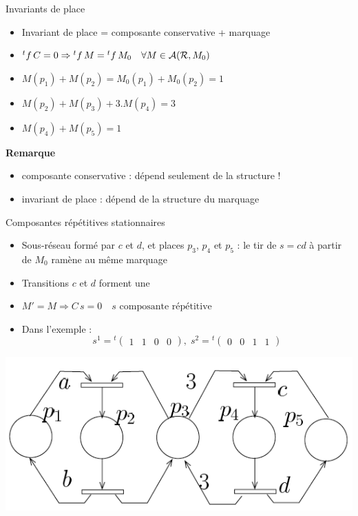 \documentclass[compress]{beamer}
\begin{document}
\begin{frame}{Invariants de place}
\begin{itemize}
\item Invariant de place = composante conservative + marquage
\item ${}^tf \, C = 0 \Rightarrow {}^tf \, M = {}^tf \, M_0 \quad \forall M \in {\cal A(R}, M_0)$
\item $M(p_1) + M(p_2) = M_0(p_1) + M_0(p_2)=1$
\item $M(p_2) + M(p_3) + 3.M(p_4) = 3$  
\item $M(p_4) + M(p_5) =1$  
\end{itemize}
{\bf Remarque} 
\begin{itemize}
\item composante conservative : dépend seulement de la structure !
\item invariant de place : dépend de la structure  du marquage
\end{itemize}
\end{frame}
  
\begin{frame}{Composantes répétitives stationnaires}
\begin{itemize}
\item Sous-réseau formé par $c$ et $d$, et places $p_3$, $p_4$ et $p_5$ : le tir de $s = cd$ à partir de $M_0$ ramène au même marquage
\item Transitions $c$ et $d$ forment une 
\item $M' = M \Rightarrow C \, s = 0 \quad s \mbox{ composante répétitive}$
\item Dans l'exemple :
$$s^1 = {}^t\begin{pmatrix}1&1&0&0\end{pmatrix}, \;
s^2 = {}^t\begin{pmatrix}0&0&1&1\end{pmatrix}$$
\end{itemize}
\begin{center}
	\includegraphics[width=.4\linewidth]{inv}
\end{center}
\end{frame}
  
\end{document}
